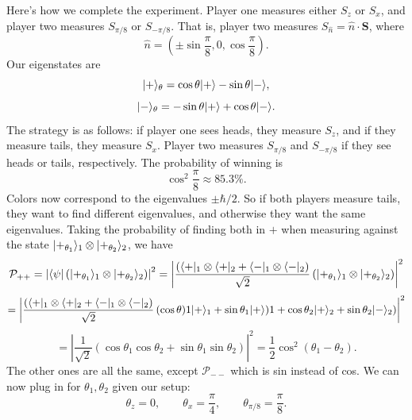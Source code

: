 Here's how we complete the experiment. Player one measures either $S_z$ or $S_x$, and player two measures $S_{\pi /8} $ or $S_{-\pi /8} $. That is, player two measures $S_{\hat{n} } =\hat{n} \cdot \mathbf{S} $, where
\[
	\hat{n} =\left( \pm \sin \frac{\pi }{8} ,0,\cos \frac{\pi }{8}  \right) 
.\]
Our eigenstates are
\[
	\lvert+\rangle_{\theta } =\cos \theta \lvert+\rangle -\sin \theta \lvert-\rangle ,
\]
\[
	\lvert-\rangle_\theta =-\sin \theta \lvert+\rangle +\cos \theta \lvert-\rangle 
.\]
The strategy is as follows: if player one sees heads, they measure $S_z$, and if they measure tails, they measure $S_x$. Player two measures $S_{\pi /8} $ and $S_{-\pi /8} $ if they see heads or tails, respectively. The probability of winning is
\[
	\cos ^2\frac{\pi }{8} \approx 85.3\%
.\]
Colors now correspond to the eigenvalues $\pm \hbar /2$. So if both players measure tails, they want to find different eigenvalues, and otherwise they want the same eigenvalues. Taking the probability of finding both in $+$ when measuring against the state $\lvert+_{\theta_1}\rangle_1 \otimes \lvert+_{\theta _2} \rangle _2$, we have
\[
	\mathcal{P}_{++} =\left| \langle\psi \rvert \left( \lvert+_{\theta_1 } \rangle_1 \otimes \lvert+_{\theta_2 } \rangle_2 \right)  \right| ^2=\left| \frac{\left( \langle+\rvert_1 \otimes \langle+\rvert_2+\langle-\rvert_1\otimes \langle-\rvert_2 \right) }{\sqrt{2} } \left( \lvert+_{\theta_1 } \rangle_1 \otimes \lvert+_{\theta_2 } \rangle_2 \right)  \right| ^2
\]
\[
	=\left|  \frac{\left( \langle+\rvert_1 \otimes \langle+\rvert_2+\langle-\rvert_1\otimes \langle-\rvert_2 \right) }{\sqrt{2} }\left( \cos \theta)1 \lvert+\rangle_1 +\sin \theta_1 \lvert+\rangle)1+\cos \theta_2 \lvert+\rangle_2+\sin \theta_2 \lvert-\rangle_2 \right) \right| ^2
\]
\[
	=\left| \frac{1}{\sqrt{2} } \left( \cos \theta_1 \cos \theta_2+\sin \theta_1 \sin \theta_2 \right)  \right| ^2=\frac{1}{2} \cos^2 (\theta_1-\theta _2)
.\]
The other ones are all the same, except $\mathcal{P}_{- -} $ which is sin instead of cos. We can now plug in for $\theta _1,\theta _2$ given our setup:
\[
	\theta_z=0,\qquad \theta_x=\frac{\pi }{4} ,\qquad \theta_{\pi /8} =\frac{\pi}{8} 
.\]

